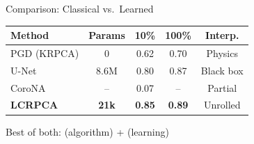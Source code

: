 \begin{frame}{Comparison: Classical vs.\ Learned}

  \vspace{0.1em}
  \small
  \renewcommand{\arraystretch}{1.25}
  \begin{center}
    \begin{tabular}{lcccc}
      \toprule
      \textbf{Method} & \textbf{Params} & \textbf{10\%} & \textbf{100\%} & \textbf{Interp.} \\
      \midrule
      PGD (KRPCA) & 0 & 0.62 & 0.70 & Physics \\
      U-Net & 8.6M & 0.80 & 0.87 & Black box \\
      CoroNA & -- & 0.07 & -- & Partial \\
      \textbf{LCRPCA} & \textbf{21k} & \textbf{0.85} & \textbf{0.89} & Unrolled \\
      \bottomrule
    \end{tabular}
  \end{center}

  \vspace{0.4em}
  \begin{shibuitip}
    Best of both:  (algorithm) +  (learning)
  \end{shibuitip}
\end{frame}

